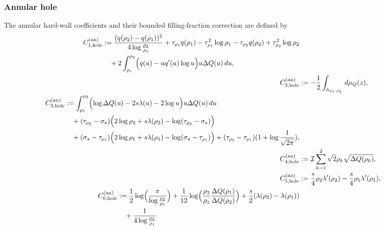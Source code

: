 \documentclass[a4paper]{article}
\numberwithin{equation}{section}
\begin{document}
\subsubsection{Annular hole}
The annular hard-wall coefficients and their bounded filling-fraction correction
are defined by
\begin{align}
\begin{split}
\label{def of C1 hole an}
C_{1,\mathrm{hole}}^{(\mathrm{an})}
&:=
\frac{(q(\rho_2)-q(\rho_1))^2}{4\log\frac{\rho_2}{\rho_1}}
+\tau_{\rho_1}q(\rho_1)
-\tau_{\rho_1}^2\log \rho_1
-\tau_{\rho_2}q(\rho_2)
+\tau_{\rho_2}^2\log \rho_2
\\
&\quad
+2\int_{\rho_1}^{\rho_2}\Bigl(q(u)-uq'(u)\log u\Bigr)u\Delta Q(u)\,du,
\end{split}
\\
\label{def of C2 hole an}
C_{2,\mathrm{hole}}^{(\mathrm{an})}
&:=
-\frac{1}{2}\int_{\mathbb{A}_{\rho_1,\rho_2}}\,d\mu_Q(z),
\\
\begin{split}
\label{def of C3 hole an}
C_{3,\mathrm{hole}}^{(\mathrm{an})}
&:=
\int_{\rho_1}^{\rho_2}
\Bigl(\log \Delta Q(u)-2s\lambda(u)-2\log u \Bigr)u\Delta Q(u)\,du
\\
&\quad 
+(\tau_{\rho_2}-\sigma_{\star})\Bigl(2\log\rho_2
+s\lambda(\rho_2)-\log (\tau_{\rho_2}-\sigma_{\star})
\Bigr)
\\
&\quad
+(\sigma_{\star}-\tau_{\rho_1})
\Bigl(2\log \rho_1
+s\lambda(\rho_1)
-\log (\sigma_{\star}-\tau_{\rho_1})\Bigr)
+(\tau_{\rho_2}-\tau_{\rho_1})(1+\log\frac{1}{\sqrt{2\pi}} ) , 
\end{split}
\\
\label{def of C4 hole an}
C_{4,\mathrm{hole}}^{(\mathrm{an})}
&:=
\mathcal{I}\sum_{k=1}^{2}\sqrt{2}\rho_k\sqrt{\Delta Q(\rho_k)},
\\
\label{def of C5 hole an}
C_{5,\mathrm{hole}}^{(\mathrm{an})}
&:=
\frac{s}{4}\rho_2\lambda'(\rho_2)-\frac{s}{4}\rho_1\lambda'(\rho_1), 
\\
\begin{split}
\label{def of C6 hole an}
C_{6,\mathrm{hole}}^{(\mathrm{an})}
&:=
\frac{1}{2}\log\Bigl(\frac{\pi}{\log\frac{\rho_2}{\rho_1}}\Bigr)
+\frac{1}{12}\log\Bigl(\frac{\rho_2}{\rho_1}\frac{\Delta Q(\rho_1)}{\Delta Q(\rho_2)}\Bigr)
+\frac{s}{2}(\lambda(\rho_2)-\lambda(\rho_1))
\\
&\quad
+\frac{1}{4\log\frac{\rho_2}{\rho_1}}

\end{split}
\end{align}
\end{document}
